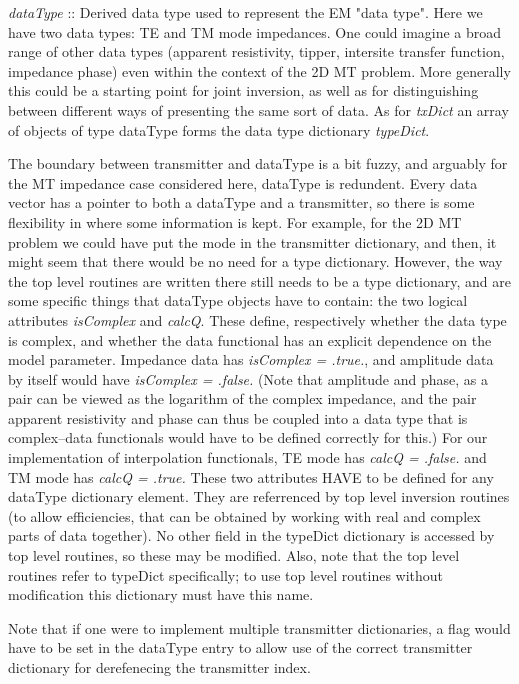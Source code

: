 \documentclass[12pt]{article}
\begin{document}
{\it dataType} :: Derived data type used to represent the EM "data type".
Here we have two data types: TE and TM mode impedances.
One could imagine a broad range of other data types
(apparent resistivity, tipper, intersite transfer function,
impedance phase) even within the context of the 2D MT 
problem.  More generally this could be a starting point
for joint inversion, as well as for distinguishing
between different ways of presenting the same sort of data.
As for {\it txDict} an array of objects of type dataType forms
the data type dictionary {\it typeDict}.

The boundary between transmitter and dataType is a bit fuzzy,
and arguably for the MT impedance case considered here,
dataType is redundent.  Every data vector has a pointer to
both a dataType and a transmitter, so there is some flexibility 
in where some information is kept.  For example, 
for the 2D MT problem we could have put the mode
in the transmitter dictionary, and then, it might seem that there
would be no need for a type dictionary.  However, the way the top 
level routines are written there still needs to be a type
dictionary, and are some specific things that dataType objects
have to contain: the two logical attributes {\it isComplex}
and {\it calcQ}.  
These define, respectively whether the data type is complex, 
and whether the data functional has an explicit dependence 
on the model parameter.  Impedance data has 
{\it isComplex = .true.}, and
amplitude data by itself would have {\it isComplex = .false.}
(Note that amplitude and phase, as a pair can be viewed
as the logarithm of the complex impedance, and the pair
apparent resistivity and phase can thus be coupled into
a data type that is complex--data functionals would have
to be defined correctly for this.)  For our implementation
of interpolation functionals, TE mode has {\it calcQ = .false.}
and TM mode has {\it calcQ = .true.}  These two attributes HAVE
to be defined for any dataType dictionary element.  They
are referrenced by top level inversion routines (to allow
efficiencies, that can be obtained by working with real and complex
parts of data together).  No other field in the typeDict
dictionary is accessed by top level routines, so these
may be modified.  Also, note that the top level routines
refer to typeDict specifically; to use top level routines
without modification this dictionary must have this name.

Note that if one were to implement multiple transmitter dictionaries,
a flag would have to be set in the dataType entry to allow
use of the correct transmitter dictionary for derefenecing
the transmitter index.
\end{document}
